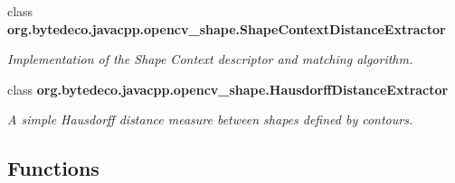 \begin{DoxyCompactItemize}
\item 
class {\bfseries org.\+bytedeco.\+javacpp.\+opencv\+\_\+shape.\+Shape\+Context\+Distance\+Extractor}
\begin{DoxyCompactList}\small\item\em Implementation of the Shape Context descriptor and matching algorithm. \end{DoxyCompactList}\item 
class {\bfseries org.\+bytedeco.\+javacpp.\+opencv\+\_\+shape.\+Hausdorff\+Distance\+Extractor}
\begin{DoxyCompactList}\small\item\em A simple Hausdorff distance measure between shapes defined by contours. \end{DoxyCompactList}\end{DoxyCompactItemize}
\subsection*{Functions}
